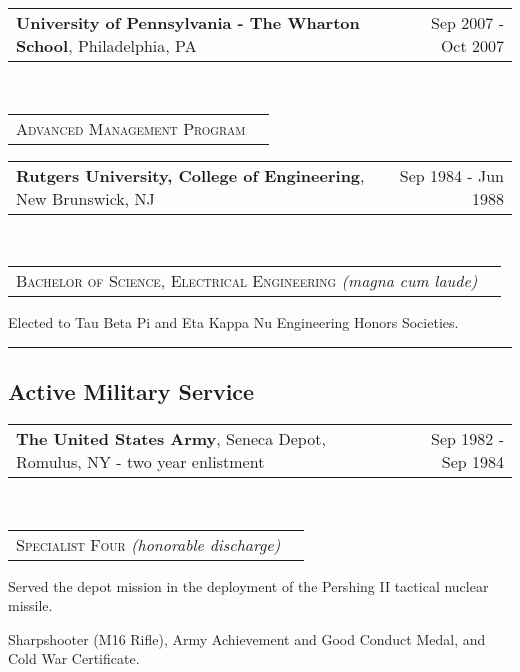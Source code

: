 \documentclass[10pt,letterpaper]{extarticle}
\makeatletter
\newcommand{\headerrow}[2]
{\begin{tabular*}{\linewidth}{l@{\extracolsep{\fill}}r}
	#1 &
	#2 \\
\end{tabular*}}
\makeatother
\begin{document}
	\item[]
	\headerrow
		{\large \textbf{University of Pennsylvania - The Wharton School}, Philadelphia, PA}
		{Sep 2007 - Oct 2007}
	\\
	\headerrow
		{\large \textsc{Advanced Management Program}}
		{}
	\item[]
	\headerrow
		{\large \textbf{Rutgers University, College of Engineering}, New Brunswick, NJ}
		{Sep 1984 - Jun 1988}
	\\
	\headerrow
		{\large \textsc{Bachelor of Science, Electrical Engineering} \emph{(magna cum laude)}}
		{}
	\vspace{-1.8em}\begin{itemize*}
		\item Elected to Tau Beta Pi and Eta Kappa Nu Engineering Honors Societies.
	\end{itemize*}

\hrule
\vspace{-1em}\subsection*{\Large Active Military Service}\vspace{-0.5em}
	
	\item[]
	\headerrow
		{\large \textbf{The United States Army}, Seneca Depot, Romulus, NY - two year enlistment}
		{Sep 1982 - Sep 1984}
	\\
	\headerrow
		{\large \textsc{Specialist Four} \emph{(honorable discharge)}}
		{}
	\vspace{-2em}\begin{itemize*}
		\item Served the depot mission in the deployment of the Pershing II tactical nuclear
		missile.
		\item Sharpshooter (M16 Rifle), Army Achievement and Good Conduct Medal, and Cold War
		Certificate.
	\end{itemize*}

\end{document}
